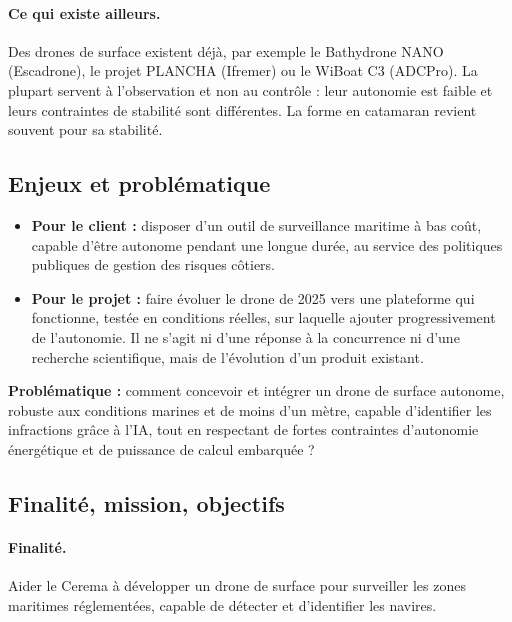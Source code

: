\paragraph{Ce qui existe ailleurs.}
Des drones de surface existent déjà, par exemple le Bathydrone NANO (Escadrone), le projet PLANCHA (Ifremer) ou le WiBoat C3 (ADCPro). La plupart servent à l'observation et non au contrôle : leur autonomie est faible et leurs contraintes de stabilité sont différentes. La forme en catamaran revient souvent pour sa stabilité.

\subsection{Enjeux et problématique}

\begin{itemize}
  \item \textbf{Pour le client :} disposer d'un outil de surveillance maritime à bas coût, capable d'être autonome pendant une longue durée, au service des politiques publiques de gestion des risques côtiers.
  \item \textbf{Pour le projet :} faire évoluer le drone de 2025 vers une plateforme qui fonctionne, testée en conditions réelles, sur laquelle ajouter progressivement de l'autonomie. Il ne s'agit ni d'une réponse à la concurrence ni d'une recherche scientifique, mais de l'évolution d'un produit existant.
\end{itemize}

\noindent\textbf{Problématique :} comment concevoir et intégrer un drone de surface autonome, robuste aux conditions marines et de moins d'un mètre, capable d'identifier les infractions grâce à l'IA, tout en respectant de fortes contraintes d'autonomie énergétique et de puissance de calcul embarquée ?

\subsection{Finalité, mission, objectifs}
\label{sec:finalite-mission-objectifs}

\paragraph{Finalité.} Aider le Cerema à développer un drone de surface pour surveiller les zones maritimes réglementées, capable de détecter et d'identifier les navires.

